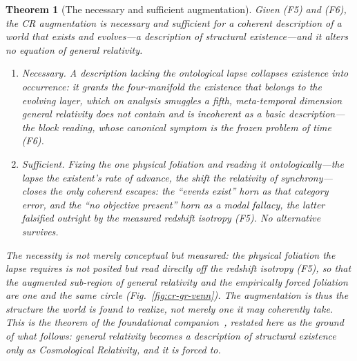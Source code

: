 \documentclass[11pt,a4paper]{article}
\theoremstyle{plain}
\newtheorem{theorem}{Theorem}
\theoremstyle{definition}
\theoremstyle{remark}
\begin{document}
\begin{theorem}[The necessary and sufficient augmentation]\label{thm:augmentation-p7}
Given \textup{(F5)} and \textup{(F6)}, the CR augmentation is necessary and sufficient for a coherent description of a world that exists and evolves---a description of \emph{structural existence}---and it alters no equation of general relativity.
\begin{enumerate}
\item[\textup{(i)}] \emph{Necessary.} A description lacking the ontological lapse collapses existence into occurrence: it grants the four-manifold the existence that belongs to the evolving layer, which on analysis smuggles a fifth, meta-temporal dimension general relativity does not contain and is incoherent as a basic description---the block reading, whose canonical symptom is the frozen problem of time \textup{(F6)}.
\item[\textup{(ii)}] \emph{Sufficient.} Fixing the one physical foliation and reading it ontologically---the lapse the existent's rate of advance, the shift the relativity of synchrony---closes the only coherent escapes: the ``events exist'' horn as that category error, and the ``no objective present'' horn as a modal fallacy, the latter falsified outright by the measured redshift isotropy \textup{(F5)}. No alternative survives.
\end{enumerate}
The necessity is not merely conceptual but \emph{measured}: the physical foliation the lapse requires is not posited but read directly off the redshift isotropy \textup{(F5)}, so that the augmented sub-region of general relativity and the empirically forced foliation are one and the same circle (Fig.~\ref{fig:cr-gr-venn}). The augmentation is thus the structure the world is found to realize, not merely one it may coherently take. This is the theorem of the foundational companion~\cite{JanzenModernParallax}, restated here as the ground of what follows: general relativity becomes a description of structural existence \emph{only} as Cosmological Relativity, and it is forced to.
\end{theorem}
\end{document}
